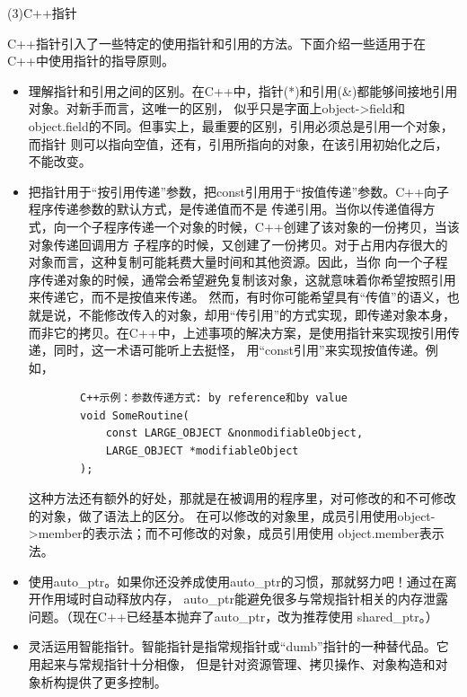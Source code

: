 \documentclass{article}
\begin{document}
\par
(3)C++指针
\par
C++指针引入了一些特定的使用指针和引用的方法。下面介绍一些适用于在C++中使用指针的指导原则。
\begin{itemize}
    \item 理解指针和引用之间的区别。在C++中，指针(*)和引用(\&)都能够间接地引用对象。对新手而言，这唯一的区别，
    似乎只是字面上object->field和object.field的不同。但事实上，最重要的区别，引用必须总是引用一个对象，而指针
    则可以指向空值，还有，引用所指向的对象，在该引用初始化之后，不能改变。
    \item 把指针用于“按引用传递”参数，把const引用用于“按值传递”参数。C++向子程序传递参数的默认方式，是传递值而不是
    传递引用。当你以传递值得方式，向一个子程序传递一个对象的时候，C++创建了该对象的一份拷贝，当该对象传递回调用方
    子程序的时候，又创建了一份拷贝。对于占用内存很大的对象而言，这种复制可能耗费大量时间和其他资源。因此，当你
    向一个子程序传递对象的时候，通常会希望避免复制该对象，这就意味着你希望按照引用来传递它，而不是按值来传递。
    然而，有时你可能希望具有“传值”的语义，也就是说，不能修改传入的对象，却用“传引用”的方式实现，即传递对象本身，
    而非它的拷贝。在C++中，上述事项的解决方案，是使用指针来实现按引用传递，同时，这一术语可能听上去挺怪，
    用“const引用”来实现按值传递。例如，
    \begin{lstlisting}
        C++示例：参数传递方式: by reference和by value
        void SomeRoutine(
            const LARGE_OBJECT &nonmodifiableObject,
            LARGE_OBJECT *modifiableObject
        );
    \end{lstlisting}
    这种方法还有额外的好处，那就是在被调用的程序里，对可修改的和不可修改的对象，做了语法上的区分。
    在可以修改的对象里，成员引用使用object->member的表示法；而不可修改的对象，成员引用使用
    object.member表示法。
    \item 使用auto\_ptr。如果你还没养成使用auto\_ptr的习惯，那就努力吧！通过在离开作用域时自动释放内存，
    auto\_ptr能避免很多与常规指针相关的内存泄露问题。（现在C++已经基本抛弃了auto\_ptr，改为推荐使用
    shared\_ptr。）
    \item 灵活运用智能指针。智能指针是指常规指针或“dumb”指针的一种替代品。它用起来与常规指针十分相像，
    但是针对资源管理、拷贝操作、对象构造和对象析构提供了更多控制。
\end{itemize}
\end{document}
